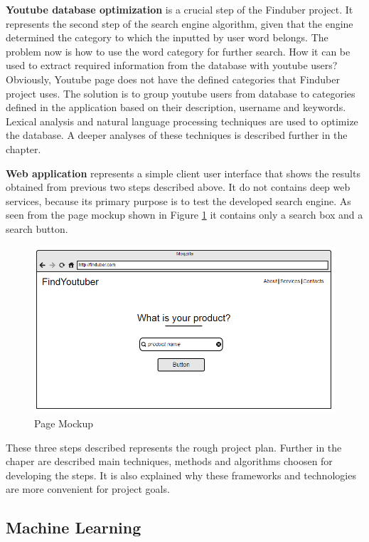 \textbf{Youtube database optimization} is a crucial step of the Finduber project. It represents the second step of the search engine algorithm, given that the engine determined the category to which the inputted by user word belongs. The problem now is how to use the word category for further search. How it can be used to extract required information from the database with youtube users? Obviously, Youtube page does not have the defined categories that Finduber project uses. The solution is to group youtube users from database to categories defined in the application based on their description, username and keywords. Lexical analysis and natural language processing techniques are used to optimize the database. A deeper analyses of these techniques is described further in the chapter. 

\textbf{Web application} represents a simple client user interface that shows the results obtained from previous two steps described above. It do not contains deep web services, because its primary purpose is to test the developed search engine. As seen from the page mockup shown in Figure \ref{pagemockup} it contains only a search box and a search button.

\begin{figure}[!ht]
\centering
\includegraphics[width=15cm]{moch}
\caption{Page Mockup} \label{pagemockup}
\end{figure}

These three steps described represents the rough project plan. Further in the chaper are described main techniques, methods and algorithms choosen for developing the steps. It is also explained why these frameworks and technologies are more convenient for project goals. 

\subsection{Machine Learning}


